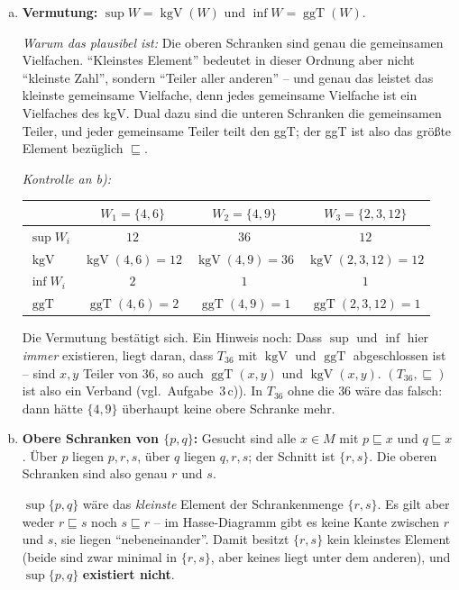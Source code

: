 \begin{loesung}
\begin{enumerate}[a)]
  \item \textbf{Vermutung:} $\sup W=\operatorname{kgV}(W)$ und $\inf W=\operatorname{ggT}(W)$.

  \emph{Warum das plausibel ist:} Die oberen Schranken sind genau die gemeinsamen Vielfachen. \enquote{Kleinstes Element} bedeutet in dieser Ordnung aber nicht \enquote{kleinste Zahl}, sondern \enquote{Teiler aller anderen} -- und genau das leistet das kleinste gemeinsame Vielfache, denn jedes gemeinsame Vielfache ist ein Vielfaches des kgV. Dual dazu sind die unteren Schranken die gemeinsamen Teiler, und jeder gemeinsame Teiler teilt den ggT; der ggT ist also das größte Element bezüglich $\sqsubseteq$.

  \emph{Kontrolle an b):}
  \begin{center}\small
  \begin{tabular}{l|c|c|c}
   & $W_1=\{4,6\}$ & $W_2=\{4,9\}$ & $W_3=\{2,3,12\}$\\\hline
  $\sup W_i$ & $12$ & $36$ & $12$\\
  $\operatorname{kgV}$ & $\operatorname{kgV}(4,6)=12$ & $\operatorname{kgV}(4,9)=36$ & $\operatorname{kgV}(2,3,12)=12$\\\hline
  $\inf W_i$ & $2$ & $1$ & $1$\\
  $\operatorname{ggT}$ & $\operatorname{ggT}(4,6)=2$ & $\operatorname{ggT}(4,9)=1$ & $\operatorname{ggT}(2,3,12)=1$
  \end{tabular}
  \end{center}

  Die Vermutung bestätigt sich. Ein Hinweis noch: Dass $\sup$ und $\inf$ hier \emph{immer} existieren, liegt daran, dass $T_{36}$ mit $\operatorname{kgV}$ und $\operatorname{ggT}$ abgeschlossen ist -- sind $x,y$ Teiler von $36$, so auch $\operatorname{ggT}(x,y)$ und $\operatorname{kgV}(x,y)$. $(T_{36},\sqsubseteq)$ ist also ein Verband (vgl.\ Aufgabe~3\,c)). In $T_{36}$ ohne die $36$ wäre das falsch: dann hätte $\{4,9\}$ überhaupt keine obere Schranke mehr.

  \item \textbf{Obere Schranken von $\{p,q\}$:} Gesucht sind alle $x\in M$ mit $p\sqsubseteq x$ und $q\sqsubseteq x$. Über $p$ liegen $p,r,s$, über $q$ liegen $q,r,s$; der Schnitt ist $\{r,s\}$. Die oberen Schranken sind also genau $r$ und $s$.

  $\sup\{p,q\}$ wäre das \emph{kleinste} Element der Schrankenmenge $\{r,s\}$. Es gilt aber weder $r\sqsubseteq s$ noch $s\sqsubseteq r$ -- im Hasse-Diagramm gibt es keine Kante zwischen $r$ und $s$, sie liegen \enquote{nebeneinander}. Damit besitzt $\{r,s\}$ kein kleinstes Element (beide sind zwar minimal in $\{r,s\}$, aber keines liegt unter dem anderen), und $\sup\{p,q\}$ \textbf{existiert nicht}.


\end{enumerate}
\end{loesung}

